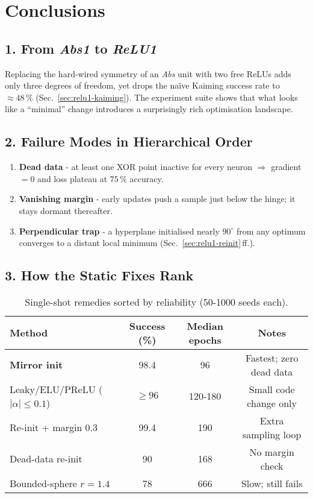 \section{Conclusions}
\label{sec:relu1-conclusions}

\subsection*{1.  From \textit{Abs1} to \textit{ReLU1}}
Replacing the hard-wired symmetry of an \emph{Abs} unit with two free
ReLUs adds only three degrees of freedom, yet drops the naïve Kaiming
success rate to $\approx 48\,\%$ (Sec.~\ref{sec:relu1-kaiming}).  
The experiment suite shows that what looks like a “minimal” change
introduces a surprisingly rich optimisation landscape.

\subsection*{2.  Failure Modes in Hierarchical Order}
\begin{enumerate}[label=(F\arabic*)]
  \item \textbf{Dead data} - at least one XOR point inactive for every
        neuron \(\Rightarrow\) gradient $=0$ and loss plateau at
        $75\,\%$ accuracy.
  \item \textbf{Vanishing margin} - early updates push a sample just
        below the hinge; it stays dormant thereafter.
  \item \textbf{Perpendicular trap} - a hyperplane initialised nearly
        $90^{\circ}$ from any optimum converges to a distant local
        minimum (Sec.~\ref{sec:relu1-reinit}\,ff.).
\end{enumerate}

\subsection*{3.  How the Static Fixes Rank}
\begin{table}[ht]
\centering
\caption{Single-shot remedies sorted by reliability (50-1000 seeds each).}
\label{tab:relu1-static-summary}
\begin{tabular}{lccc}
\toprule
Method & Success (\%) & Median epochs & Notes\\
\midrule
\textbf{Mirror init} & 98.4 & 96 & Fastest; zero dead data\\
Leaky/ELU/PReLU ($|\alpha|\!\le\!0.1$) & $\ge96$ & 120-180 & Small code change only\\
Re-init + margin 0.3 & 99.4 & 190 & Extra sampling loop\\
Dead-data re-init & 90 & 168 & No margin check\\
Bounded-sphere $r=1.4$ & 78 & 666 & Slow; still fails\\
\bottomrule
\end{tabular}
\end{table}

